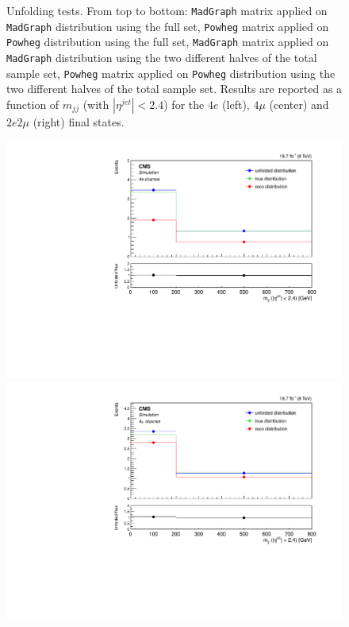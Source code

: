 \begin{figure}[hbtp]
\begin{center}
      \caption{Unfolding tests. From top to bottom: \texttt{MadGraph} matrix applied on \texttt{MadGraph} distribution using the full set, \texttt{Powheg} matrix applied on \texttt{Powheg} distribution using the full set,  \texttt{MadGraph} matrix applied on \texttt{MadGraph} distribution using the two different halves of the total sample set, \texttt{Powheg} matrix applied on \texttt{Powheg} distribution using the two different halves of the total sample set. Results are reported as a function of $m_{jj}$ (with $|\eta^{jet}|<2.4$) for the $4e$ (left), $4\mu$ (center) and $2e2\mu$ (right) final states.}
    \label{fig:MCtest_CentralMjj1}
  \end{center}
\end{figure}

\begin{figure}[hbtp]
  \begin{center}
    \includegraphics[width=0.8\cmsFigWidth]{Figures/Unfolding/MCTests/CentralMjj_ZZTo4e_MadMatrix_PowDistr_FullSample_fr}     
    \includegraphics[width=0.8\cmsFigWidth]{Figures/Unfolding/MCTests/CentralMjj_ZZTo4m_MadMatrix_PowDistr_FullSample_fr}     

\end{center}
\end{figure}
